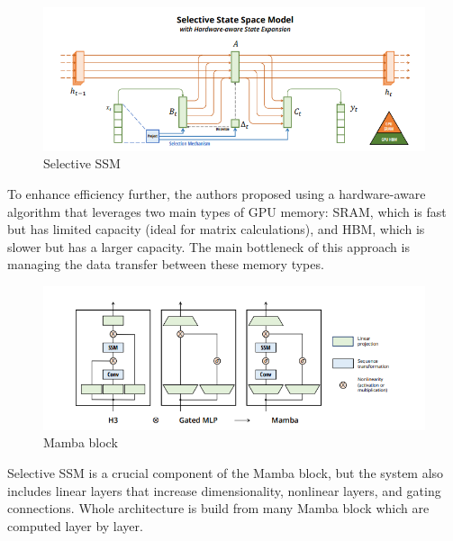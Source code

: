 \documentclass[conference,compsoc]{IEEEtran}
\begin{document}
\begin{figure}[!htbp]
    \centering \includegraphics[width=\linewidth]{../assets/SelectiveSSM.png}
    \caption{Selective SSM \cite{mamba}}
    \label{fig:ssm}
\end{figure}

To enhance efficiency further, the authors proposed using a hardware-aware algorithm that leverages two main types of GPU memory:
SRAM, which is fast but has limited capacity (ideal for matrix calculations), and HBM, which is slower but has a larger capacity.
The main bottleneck of this approach is managing the data transfer between these memory types.

\begin{figure}[!htbp]
    \centering \includegraphics[width=\linewidth]{../assets/Mamba.png}
    \caption{Mamba block \cite{mamba}}
    \label{fig:mamba}
\end{figure}

Selective SSM is a crucial component of the Mamba block, but the system also includes linear layers that increase dimensionality, nonlinear layers, and gating connections.
Whole architecture is build from many Mamba block which are computed layer by layer.
\end{document}
